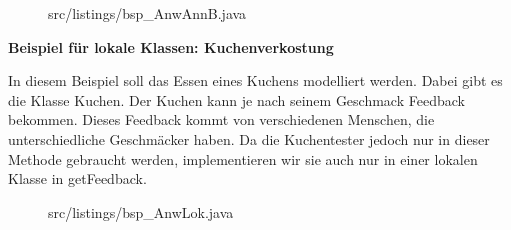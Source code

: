\begin{figure}[H]
\lstset{language=Java}
 {src/listings/bsp_AnwAnnB.java}
\end{figure}
\newpage
{\bf Beispiel für lokale Klassen: Kuchenverkostung}

In diesem Beispiel soll das Essen eines Kuchens modelliert werden.
 Dabei gibt es die Klasse Kuchen. Der Kuchen kann je nach seinem Geschmack Feedback bekommen.
Dieses Feedback kommt von verschiedenen Menschen, die unterschiedliche Geschmäcker haben.
Da die Kuchentester jedoch nur in dieser Methode gebraucht werden, implementieren wir sie auch nur in einer lokalen Klasse in getFeedback.

\begin{figure}[H]
\lstset{language=Java}
 {src/listings/bsp_AnwLok.java}
\end{figure}

